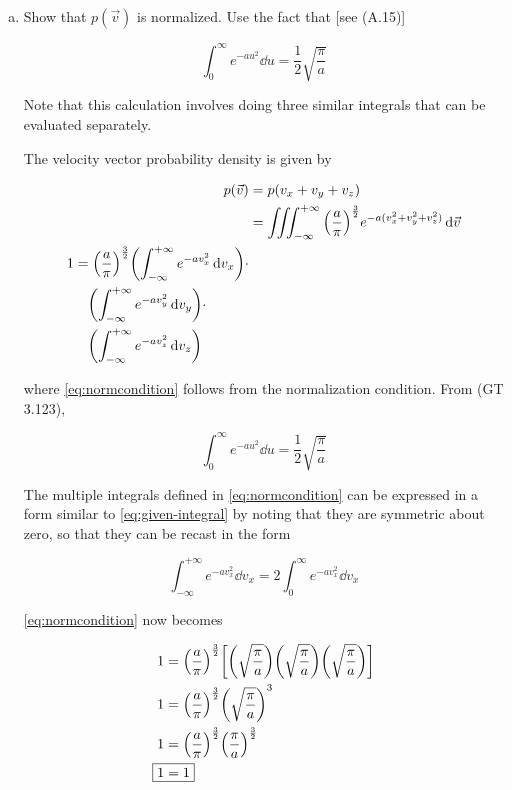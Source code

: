 \documentclass[9pt,a4paper,twocolumn]{article}
\begin{document}
\begin{enumerate}[(a)]

\item Show that $p(\vec{v})$ is normalized. Use the fact that [see (A.15)]

\begin{equation}
	\int_0^\infty e^{-au^2} \dd{u} = \frac{1}{2}\sqrt{\frac{\pi}{a}}
\end{equation}

Note that this calculation involves doing three similar integrals that can be evaluated separately.


The velocity vector probability density is given by

\begin{align}
	p(\vec{v}) &= p(v_x + v_y + v_z) \\
	&= \iiint_{-\infty}^{+\infty} \qty(\frac{a}{\pi})^{\frac{3}{2}} e^{-a(v_x^2 + v_y^2 + v_z^2)} \dd{\vec{v}} \label{eq:combined-integral} \\
	\begin{split}
		1 &= \qty(\frac{a}{\pi})^{\frac{3}{2}}\qty(\int_{-\infty}^{+\infty} e^{-av_x^2} \dd{v_x}) \cdot \\
		& \quad \qty(\int_{-\infty}^{+\infty} e^{-av_y^2} \dd{v_y}) \cdot \\
		& \quad \qty(\int_{-\infty}^{+\infty} e^{-av_z^2} \dd{v_z}) \label{eq:normcondition}
	\end{split}
\end{align}

where \eqref{eq:normcondition} follows from the normalization condition. From (GT 3.123),

\begin{equation}\label{eq:given-integral}
	\int_0^\infty e^{-au^2}\dd{u} = \frac{1}{2}\sqrt{\frac{\pi}{a}}
\end{equation}

The multiple integrals defined in \eqref{eq:normcondition} can be expressed in a form similar to \eqref{eq:given-integral} by noting that they are symmetric about zero, so that they can be recast in the form

\begin{equation}\label{eq:symmetric-integral}
	\int_{-\infty}^{+\infty} e^{-av_x^2}\dd{v_x} = 2\int_0^\infty e^{-av_x^2} \dd{v_x}
\end{equation}

\eqref{eq:normcondition} now becomes

\begin{align}
	1 &= \qty(\frac{a}{\pi})^{\frac{3}{2}} \qty[\qty(\sqrt{\frac{\pi}{a}}) \qty(\sqrt{\frac{\pi}{a}}) \qty(\sqrt{\frac{\pi}{a}})] \nonumber \\
	1 &= \qty(\frac{a}{\pi})^{\frac{3}{2}} \qty(\sqrt{\frac{\pi}{a}})^3 \nonumber \\
	1 &= \qty(\frac{a}{\pi})^{\frac{3}{2}} \qty(\frac{\pi}{a})^{\frac{3}{2}} \nonumber \\
	\Aboxed{
		1 &= 1
	} \label{eq:answer-a}
\end{align}


\end{enumerate}
\end{document}
